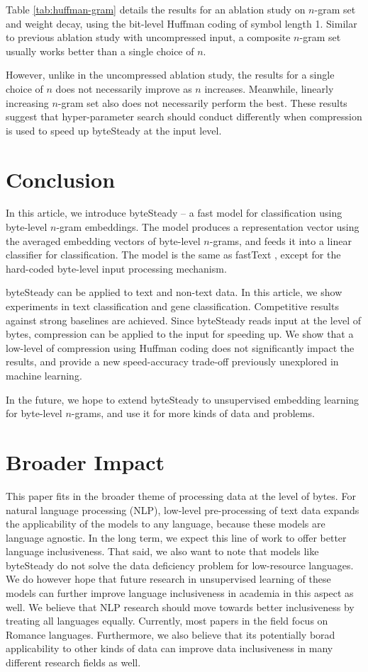 \documentclass{article}
\begin{document}
Table \ref{tab:huffman-gram} details the results for an ablation study on \(n\)-gram set and weight decay, using the bit-level Huffman coding of symbol length 1. Similar to previous ablation study with uncompressed input, a composite \(n\)-gram set usually works better than a single choice of \(n\).

However, unlike in the uncompressed ablation study, the results for a single choice of \(n\) does not necessarily improve as \(n\) increases. Meanwhile, linearly increasing \(n\)-gram set also does not necessarily perform the best. These results suggest that hyper-parameter search should conduct differently when compression is used to speed up byteSteady at the input level.

\section{Conclusion}

In this article, we introduce byteSteady -- a fast model for classification using byte-level \(n\)-gram embeddings. The model produces a representation vector using the averaged embedding vectors of byte-level \(n\)-grams, and feeds it into a linear classifier for classification. The model is the same as fastText \cite{JGBM16}, except for the hard-coded byte-level input processing mechanism.

byteSteady can be applied to text and non-text data. In this article, we show experiments in text classification and gene classification. Competitive results against strong baselines are achieved. Since byteSteady reads input at the level of bytes, compression can be applied to the input for speeding up. We show that a low-level of compression using Huffman coding does not significantly impact the results, and provide a new speed-accuracy trade-off previously unexplored in machine learning.

In the future, we hope to extend byteSteady to unsupervised embedding learning for byte-level \(n\)-grams, and use it for more kinds of data and problems.

\section*{Broader Impact}

This paper fits in the broader theme of processing data at the level of bytes. For natural language processing (NLP), low-level pre-processing of text data expands the applicability of the models to any language, because these models are language agnostic. In the long term, we expect this line of work to offer better language inclusiveness. That said, we also want to note that models like byteSteady do not solve the data deficiency problem for low-resource languages. We do however hope that future research in unsupervised learning of these models can further improve language inclusiveness in academia in this aspect as well. We believe that NLP research should move towards better inclusiveness by treating all languages equally. Currently, most papers in the field focus on Romance languages. Furthermore, we also believe that its potentially borad applicability to other kinds of data can improve data inclusiveness in many different research fields as well.
\end{document}
